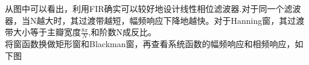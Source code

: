 \documentclass[UTF8]{ctexart}
\begin{document}
从图中可以看出，利用FIR确实可以较好地设计线性相位滤波器.对于同一个滤波器，当N越大时，其过渡带越短，幅频响应下降地越快。对于Hanning窗，其过渡带大小等于主瓣宽度$\frac{8\pi}{N}$,和阶数N成反比。\\
将窗函数换做矩形窗和Blackman窗，再查看系统函数的幅频响应和相频响应，如下图
\begin{figure}[H]
	\centering
	\quad

\end{figure}
\end{document}
